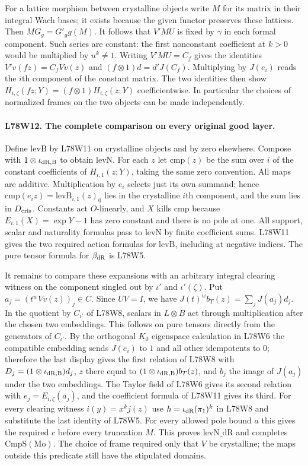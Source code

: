 For a lattice morphism between crystalline objects write $M$
for its matrix in their integral Wach bases; it exists because
the given functor preserves these lattices. Then
$M G_g=G'_g g(M)$. It follows that $V'MU$ is fixed by $\gamma$
in each formal component. Such series are constant: the first
nonconstant coefficient at $k>0$ would be multiplied by
$u^k\ne1$. Writing $V'MU=C_f$ gives the identities
$V'v(fz)=C_fVv(z)$ and $(f\otimes 1)d=d'J(C_f)$.
Multiplying by $J(e_i)$ reads the $i$th component of the
constant matrix. The two identities then show
$H_{i,\zeta}(fz;Y)=(f\otimes1)H_{i,\zeta}(z;Y)$ coefficientwise.
In particular the choices of normalized frames on the two
objects can be made independently.

\paragraph{L78W12. The complete comparison on every original good layer.}
Define $\mathrm{levB}$ by L78W11 on crystalline objects and by zero
elsewhere. Compose with $1\otimes\iota_{\rm dR,B}$ to obtain
$\mathrm{levN}$. For each $z$ let $\mathrm{cmp}(z)$ be the sum
over $i$ of the constant coefficients of $H_{i,1}(z;Y)$, taking
the same zero convention. All maps are additive.
Multiplication by $e_i$ selects just its own summand; hence
$\mathrm{cmp}(e_iz)=\mathrm{levB}_{i,1}(z)_0$ lies in the
crystalline $i$th component, and the sum lies in $D_{\rm cris}$.
Constants act $O$-linearly, and $X$ kills $\mathrm{cmp}$ because
$E_{i,1}(X)=\exp Y-1$ has zero constant and there is no pole at one.
All support, scalar and naturality formulas pass to $\mathrm{levN}$
by finite coefficient sums. L78W11 gives the two required action
formulas for $\mathrm{levB}$, including at negative indices.
The pure tensor formula for $\beta_{\rm dR}$ is L78W5.

It remains to compare these expansions with an arbitrary integral
clearing witness on the component singled out by $\iota'$ and
$\iota'(\zeta)$. Put $a_j=(t^w Vv(z))_j\in C$.
Since $UV=I$, we have
$J(t)^w b_T(z)=\sum_j J(a_j)d_j$.
In the quotient by $C_{\iota'}$ of L78W8, scalars in
$L\otimes B$ act through multiplication after the chosen two
embeddings. This follows on pure tensors directly from the
generators of $C_{\iota'}$. By the orthogonal $K_0$ eigenspace
calculation in L78W6 the compatible embedding sends
$J(e_i)$ to $1$ and all other idempotents to $0$; therefore the
last display gives the first relation of L78W8 with
$D_j=(1\otimes\iota_{\rm dR,B})d_j$,
$z$ there equal to $(1\otimes\iota_{\rm dR,B})b_T(z)$, and
$b_j$ the image of $J(a_j)$ under the two embeddings.
The Taylor field of L78W6 gives its second relation with
$e_j=E_{i,\zeta}(a_j)$, and the coefficient formula of L78W11
gives its third. For every clearing witness $i(y)=x^k j(z)$ use
$h=\iota_{\rm dR}(\pi_1)^k$ in L78W8 and substitute the last
identity of L78W5. For every allowed pole bound $a$ this gives
the required $c$ before every truncation $M$. This proves
$\mathrm{levN\_dR}$ and completes $\mathrm{CmpS}(\mathrm{Mo})$.
The choice of frame required only that $V$ be crystalline;
the maps outside this predicate still have the stipulated domains.

